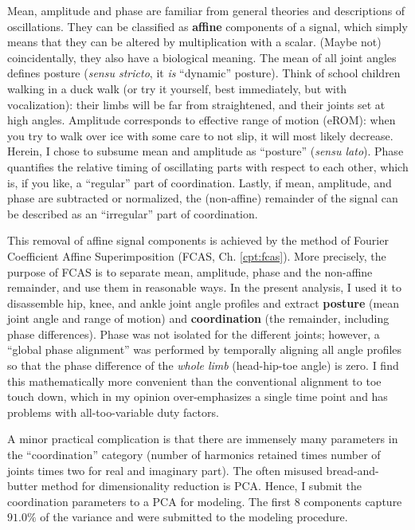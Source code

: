 Mean, amplitude and phase are familiar from general theories and descriptions of oscillations.
They can be classified as \textbf{affine} components of a signal, which simply means that they can be altered by multiplication with a scalar.
(Maybe not) coincidentally, they also have a biological meaning.
The mean of all joint angles defines posture (\emph{sensu stricto}, it \emph{is} ``dynamic'' posture).
Think of school children walking in a duck walk (or try it yourself, best immediately, but with vocalization): their limbs will be far from straightened, and their joints set at high angles.
Amplitude corresponds to effective range of motion (eROM): when you try to walk over ice with some care to not slip, it will most likely decrease.
Herein, I chose to subsume mean and amplitude as ``posture'' (\emph{sensu lato}).
Phase quantifies the relative timing of oscillating parts with respect to each other, which is, if you like, a ``regular'' part of coordination.
Lastly, if mean, amplitude, and phase are subtracted or normalized, the (non-affine) remainder of the signal can be described as an ``irregular'' part of coordination.

This removal of affine signal components is achieved by the method of Fourier Coefficient Affine Superimposition (FCAS, Ch. \ref{cpt:fcas}).
More precisely, the purpose of FCAS is to separate mean, amplitude, phase and the non-affine remainder, and use them in reasonable ways.
In the present analysis, I used it to disassemble hip, knee, and ankle joint angle profiles and extract \textbf{posture} (mean joint angle and range of motion) and \textbf{coordination} (the remainder, including phase differences).
Phase was not isolated for the different joints; however, a ``global phase alignment'' was performed by temporally aligning all  angle profiles so that the phase difference of the \emph{whole limb} (head-hip-toe angle) is zero.
I find this mathematically more convenient than the conventional alignment to toe touch down, which in my opinion over-emphasizes a single time point and has problems with all-too-variable duty factors.

A minor practical complication is that there are immensely many parameters in the ``coordination'' category (number of harmonics retained times number of joints times two for real and imaginary part).
The often misused bread-and-butter method for dimensionality reduction is PCA.
Hence, I submit the coordination parameters to a PCA for modeling.
The first \(8\) components capture \(91.0 \%\) of the variance and were submitted to the modeling procedure.


